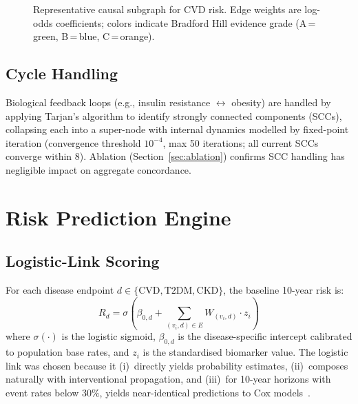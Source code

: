 \documentclass[runningheads]{llncs}
\begin{document}
\begin{figure}[t]
\caption{Representative causal subgraph for CVD risk.  Edge weights
are log-odds coefficients; colors indicate Bradford Hill evidence
grade (A\,=\,green, B\,=\,blue, C\,=\,orange).}\label{fig:cvd_subgraph}
\end{figure}

\subsection{Cycle Handling}\label{sec:cycles}

Biological feedback loops (e.g., insulin resistance
$\leftrightarrow$ obesity) are handled by applying Tarjan's algorithm
to identify strongly connected components (SCCs), collapsing each into
a super-node with internal dynamics modelled by fixed-point iteration
(convergence threshold $10^{-4}$, max 50 iterations; all current SCCs
converge within 8).  Ablation (Section~\ref{sec:ablation}) confirms
SCC handling has negligible impact on aggregate concordance.

\section{Risk Prediction Engine}\label{sec:risk}

\subsection{Logistic-Link Scoring}\label{sec:logistic}

For each disease endpoint $d \in \{\text{CVD}, \text{T2DM}, \text{CKD}\}$,
the baseline 10-year risk is:
\begin{equation}\label{eq:risk}
R_d = \sigma\!\left(\beta_{0,d} + \sum_{(v_i, d) \in E} W_{(v_i,d)} \cdot z_i\right)
\end{equation}
where $\sigma(\cdot)$ is the logistic sigmoid, $\beta_{0,d}$ is the
disease-specific intercept calibrated to population base rates, and
$z_i$ is the standardised biomarker value.  The logistic link was
chosen because it (i)~directly yields probability estimates, (ii)~composes
naturally with interventional propagation, and (iii)~for 10-year horizons
with event rates below 30\%, yields near-identical predictions to Cox
models~\cite{dagostino2008}.
\end{document}
